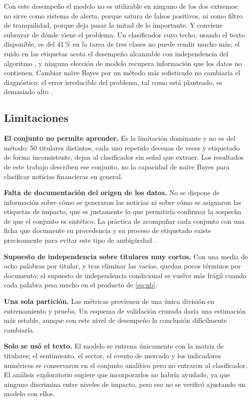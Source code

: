 \documentclass[11pt, a4paper]{article}
\begin{document}
Con este desempeño el modelo no es utilizable en ninguno de los dos extremos: no sirve como
sistema de alerta, porque satura de falsos positivos, ni como filtro de tranquilidad, porque deja
pasar la mitad de lo importante. Y conviene subrayar de dónde viene el problema. Un clasificador
cuyo techo, usando el texto disponible, es del 41\,\% en la tarea de tres clases no puede rendir
mucho más; el ruido en las etiquetas acota el desempeño alcanzable con independencia del algoritmo
\cite{frenay2014}, y ninguna elección de modelo recupera información que los datos no contienen.
Cambiar naïve Bayes por un método más sofisticado no cambiaría el diagnóstico: el error
irreducible del problema, tal como está planteado, es demasiado alto \cite{hastie2009}.

\subsection{Limitaciones}

\textbf{El conjunto no permite aprender.} Es la limitación dominante y no es del método: 50
titulares distintos, cada uno repetido decenas de veces y etiquetado de forma inconsistente, dejan
al clasificador sin señal que extraer. Los resultados de este trabajo describen ese conjunto, no la
capacidad de naïve Bayes para clasificar noticias financieras en general.

\textbf{Falta de documentación del origen de los datos.} No se dispone de información sobre cómo se
generaron las noticias ni sobre cómo se asignaron las etiquetas de impacto, que es justamente lo
que permitiría confirmar la sospecha de que el conjunto es sintético. La práctica de acompañar cada
conjunto con una ficha que documente su procedencia y su proceso de etiquetado existe precisamente
para evitar este tipo de ambigüedad \cite{gebru2021}.

\textbf{Supuesto de independencia sobre titulares muy cortos.} Con una media de ocho palabras por
titular, y tras eliminar las vacías, quedan pocos términos por documento; el supuesto de
independencia condicional se vuelve más frágil cuando cada palabra pesa mucho en el producto de
\eqref{eq:nb}.

\textbf{Una sola partición.} Las métricas provienen de una única división en entrenamiento y
prueba. Un esquema de validación cruzada daría una estimación más estable, aunque con este nivel de
desempeño la conclusión difícilmente cambiaría.

\textbf{Solo se usó el texto.} El modelo se entrena únicamente con la matriz de titulares; el
sentimiento, el sector, el evento de mercado y los indicadores numéricos se conservaron en el
conjunto analítico pero no entraron al clasificador. El análisis exploratorio sugiere que
incorporarlos no habría ayudado, ya que ninguno discrimina entre niveles de impacto, pero eso no se
verificó ajustando un modelo con ellos.
\end{document}
